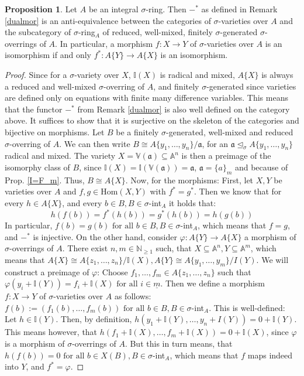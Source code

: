 \documentclass{article}
\def\I{\mathbb{I}}
\def\NE{\mathbb{N}_{\geq1}}
\def\VV{\mathbb{V}}
\def\a{\mathfrak{a}}
\def\s{\sigma}
\def\si{\unlhd_{\sigma}}
\def\Hom{\text{Hom}}
\def\fa{\text{ for all }}
\newenvironment{bew}{\begin{proof}[Proof]}{\end{proof}}
\theoremstyle{definition}
\newtheorem{prop}[Satz]{Proposition}
\begin{document}
\begin{prop}\label{dualisequiv}
Let $A$ be an integral $\s$-ring. Then $-^*$ as defined in Remark \ref{dualmor} is an anti-equivalence between the categories of $\s$-varieties over $A$ and the subcategory of $\s$-ring$_A$ of reduced, well-mixed, finitely $\s$-generated $\s$-overrings of $A$. 
In particular, a morphism $f: X \rightarrow Y$ of $\s$-varieties over $A$ is an isomorphism if and only $f^*: A\{Y\} \rightarrow A\{X\}$ is an isomorphism.
\begin{bew}
Since for a $\s$-variety over $X$, $\I(X)$ is radical and mixed, $A\{X\}$ is always a reduced and well-mixed $\s$-overring of $A$, 
and finitely $\s$-generated since varieties are defined only on equations with finite many difference variables. This means that the functor $-^*$ from Remark \ref{dualmor} is also well defined on the category above.
It suffices to show that it is surjective on the skeleton of the categories and bijective on morphisms. 
Let $B$ be a finitely $\s$-generated, well-mixed and reduced $\s$-overring of $A$. We can then write $B \cong A\{y_1,\ldots,y_n\}/\a$, for an $\a \si A\{y_1,\ldots,y_n\}$ radical and mixed. The variety $X = \VV(\a) \subseteq \mathbb{A}^n$
is then a preimage of the isomorphy class of $B$, since $\I(X) = \I(\VV(\a)) = \a$, $\a = \{ a \}_m$ and because of Prop. \ref{I=F_m}. Thus, $B \cong A\{X\}$.
Now, for the morphisms: First, let $X,Y$ be varieties over $A$ and $f,g \in \Hom(X,Y)$ with $f^* = g^*$. Then we know that for every $h \in A\{X\}$, and every $b \in B, B \in \s$-int$_A$ it holds that:
\[ h(f(b)) = f^*(h(b)) = g^*(h(b)) = h(g(b)) \]
In particular, $f(b) = g(b) \fa b \in B, B \in \s$-int$_A$, which means that $f = g$, and $-^*$ is injective. 
On the other hand, consider $\varphi: A\{Y\} \rightarrow A\{X\}$ a morphism of $\s$-overrings of $A$. There exist $n,m \in \NE$ such, that $X \subseteq \mathbb{A}^n, Y \subseteq \mathbb{A}^m$,
 which means that $A\{X\} \cong A\{z_1,\ldots,z_n\}/\I(X), A\{Y\} \cong A\{y_1,\ldots,y_m\}/I(Y)$. We will construct a preimage of $\varphi$: Choose $f_1,\ldots,f_m \in A\{z_1,\ldots,z_n\}$ such that $\varphi(y_i + \I(Y)) = f_i + \I(X) \fa i \in \underline{m}$.
Then we define a morphism $f: X \rightarrow Y$ of $\s$-varieties over $A$ as follows: $f(b) := (f_1(b),\ldots,f_m(b)) \fa b \in B, B \in \s$-int$_A$. This is well-defined: Let $h \in \I(Y)$. Then, by definition, $h(y_1 + \I(Y),\ldots,y_n + I(Y)) = 0 + \I(Y)$.
This means however, that $h(f_1 + \I(X),\ldots,f_m + \I(X)) = 0 + \I(X)$, since $\varphi$ is a morphism of $\s$-overrings of $A$. But this in turn means, that $h(f(b)) = 0 \fa b \in X(B), B \in \s$-int$_A$, which means that $f$ maps indeed into $Y$, and $f^* = \varphi$.
\end{bew}
\end{prop}
\end{document}

